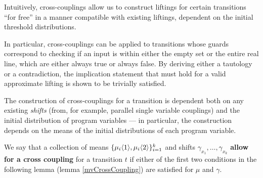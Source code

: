 Intuitively, cross-couplings allow us to construct liftings for certain transitions ``for free'' in a manner compatible with existing liftings, dependent on the initial threshold distributions. 

In particular, cross-couplings can be applied to transitions whose guards correspond to checking if an input is within either the empty set or the entire real line, which are either always true or always false. By deriving either a tautology or a contradiction, the implication statement that must hold for a valid approximate lifting is shown to be trivially satisfied. 

The construction of cross-couplings for a transition is dependent both on any existing \textit{shifts} (from, for example, parallel single variable couplings) and the initial distribution of program variables --- in particular, the construction depends on the means of the initial distributions of each program variable. 

We say that a collection of means $\{\mu_i\langle1 \rangle, \mu_i\langle2 \rangle\}_{i=1}^k$ and shifts $\gamma_{x_1},\ldots,\gamma_{x_k}$ \textbf{allow for a cross coupling} for a transition $t$ if either of the first two conditions in the following lemma (lemma \ref{mvCrossCoupling}) are satisfied for $\mu$ and $\gamma$. 

